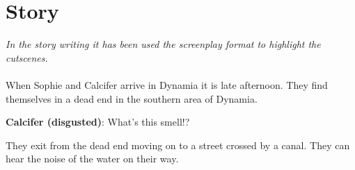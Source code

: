 \section{Story}

\textit{In the story writing it has been used the screenplay format to highlight the cutscenes.}\\\\

When Sophie and Calcifer arrive in Dynamia it is late afternoon. They find themselves in a dead end in the southern area of Dynamia.

\textbf{Calcifer (disgusted)}: What's this smell!?

They exit from the dead end moving on to a street crossed by a canal. They can hear the noise of the water on their way.

